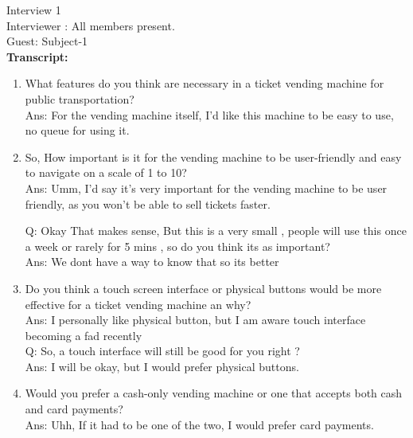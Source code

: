 Interview 1\\
Interviewer : All members present. \\
Guest: Subject-1\\
\textbf{Transcript:}
\begin{enumerate}
    \item What features do you think are necessary in a ticket vending machine for public transportation?\\
Ans: For the vending machine itself, I’d like this machine to be easy to use, no queue for using it.
    \item So, How important is it for the vending machine to be user-friendly and easy to navigate on a scale of 1 to 10?\\
Ans: Umm, I'd say it's very important for the vending machine to be user friendly, as you won't be able to sell tickets faster.

Q: Okay That makes sense, But this is a very small , people will use this once a week or rarely for 5 mins , so do you think its as important?\\
Ans: We dont have a way to know that so its better 
    \item Do you think a touch screen interface or physical buttons would be more effective for a ticket vending machine an why?\\
	Ans: I personally like physical button, but I am aware touch interface becoming a fad recently\\
	Q: So, a touch interface will still be good for you right ?\\
Ans: I will be okay, but I would prefer physical buttons.
    \item Would you prefer a cash-only vending machine or one that accepts both cash and card payments?\\
Ans: Uhh, If it had to be one of the two, I would prefer card payments.


\end{enumerate}
